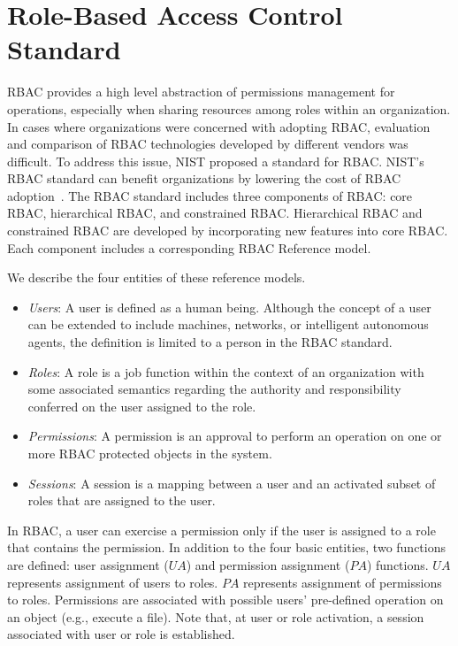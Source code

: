 \section{Role-Based Access Control Standard} \label{sec:core-rbac}

RBAC provides a high level abstraction of permissions management for operations, especially when sharing resources among roles within an organization. 
In cases where organizations were concerned with adopting RBAC, evaluation and comparison of RBAC technologies developed by different vendors was difficult.
To address this issue, NIST proposed a standard for RBAC.
NIST's RBAC standard can benefit organizations by lowering the cost of RBAC adoption~\cite{o20102010}.
The RBAC standard includes three components of RBAC: core RBAC, hierarchical RBAC, and constrained RBAC. 
Hierarchical RBAC and constrained RBAC are developed by incorporating new features into core RBAC.
Each component includes a corresponding RBAC Reference model.

We describe the four entities of these reference models.

\begin{itemize}
\setlength{\itemsep}{0.25pt}
\item \emph{Users}: A user is defined as a human being. Although the concept of a user can be extended to include machines, networks, or intelligent autonomous agents, the definition is limited to a person in the RBAC standard. 
\item \emph{Roles}: A role is a job function within the context of an organization with some associated semantics regarding the authority and responsibility conferred on the user assigned to the role.
\item \emph{Permissions}: A permission is an approval to perform an operation on one or more RBAC protected objects in the system.
\item \emph{Sessions}: A session is a mapping between a user and an activated subset of roles that are assigned to the user.
\end{itemize}


In RBAC, a user can exercise a permission only if the user is assigned to a role that contains the permission.
In addition to the four basic entities, two functions are defined:
user assignment ($UA$) and permission assignment ($PA$) functions.
$UA$ represents assignment of users to roles.
$PA$ represents assignment of permissions to roles.
Permissions are associated with possible users' pre-defined operation on an object (e.g., execute a file).
Note that, at user or role activation, a session associated with user or role is established.

